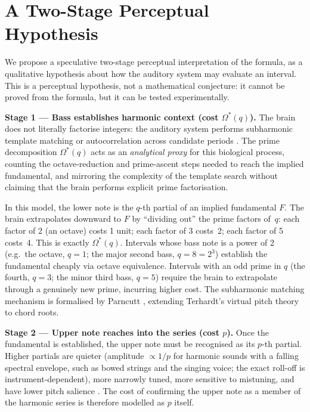 \documentclass[11pt,a4paper]{article}
\newcommand{\Os}{\Omega^{\!*}}
\begin{document}

\section{A Two-Stage Perceptual Hypothesis}

We propose a speculative two-stage perceptual interpretation of the formula,
as a qualitative hypothesis about how the auditory system may evaluate an
interval. This is a perceptual hypothesis, not a mathematical conjecture:
it cannot be proved from the formula, but it can be tested experimentally.

\medskip\noindent
\textbf{Stage 1 --- Bass establishes harmonic context (cost $\Os(q)$).}
The brain does not literally factorise integers: the auditory system performs
subharmonic template matching or autocorrelation across candidate periods
\cite{parncutt1988,terhardt1979}. The prime decomposition $\Os(q)$ acts as an
\emph{analytical proxy} for this biological process, counting the
octave-reduction and prime-ascent steps needed to reach the implied
fundamental, and mirroring the complexity of the template search without
claiming that the brain performs explicit prime factorisation.

In this model, the lower note is the $q$-th partial of an implied fundamental
$F$. The brain extrapolates downward to $F$ by ``dividing out'' the prime
factors of~$q$: each factor of 2 (an octave) costs 1 unit; each factor of 3
costs~2; each factor of 5 costs~4. This is exactly $\Os(q)$. Intervals whose
bass note is a power of 2 (e.g.\ the octave, $q=1$; the major second bass,
$q=8=2^3$) establish the fundamental cheaply via octave equivalence. Intervals
with an odd prime in $q$ (the fourth, $q=3$; the minor third bass, $q=5$)
require the brain to extrapolate through a genuinely new prime, incurring
higher cost. The subharmonic matching mechanism is formalised by Parncutt
\cite{parncutt1988}, extending Terhardt's virtual pitch theory to chord roots.

\medskip\noindent
\textbf{Stage 2 --- Upper note reaches into the series (cost $p$).}
Once the fundamental is established, the upper note must be recognised as its
$p$-th partial. Higher partials are quieter (amplitude $\propto 1/p$ for
harmonic sounds with a falling spectral envelope, such as bowed strings and
the singing voice; the exact roll-off is instrument-dependent), more narrowly
tuned, more sensitive to mistuning, and have lower pitch salience
\cite{terhardt1979}. The cost of confirming the upper note as a member of the
harmonic series is therefore modelled as $p$ itself.
\end{document}
